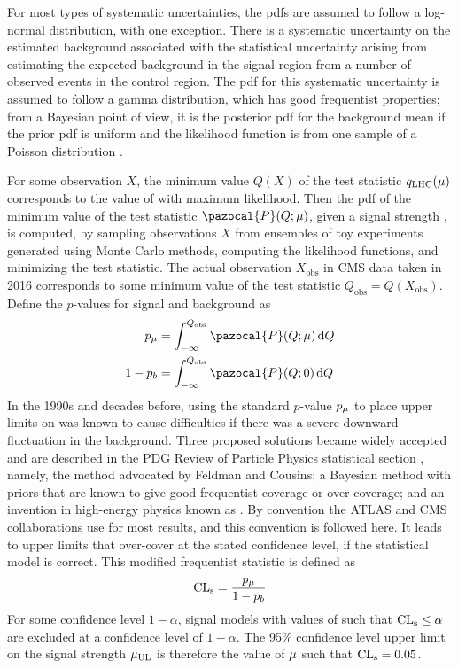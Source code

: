 For most types of systematic uncertainties, the pdfs are assumed to follow a log-normal distribution, with one exception.
There is a systematic uncertainty on the estimated background associated with the statistical uncertainty arising from estimating the expected background in the signal region from a number of observed events in the control region.
The pdf for this systematic uncertainty is assumed to follow a gamma distribution, which has good frequentist properties; from a Bayesian point of view, it is the posterior pdf for the background mean if the prior pdf is uniform and the likelihood function is from one sample of a Poisson distribution \cite{Cousins:ZBi2008, Cousins:LogNormal}.

For some observation $X$, the minimum value $Q(X)$ of the test statistic $q_\text{LHC}(\mu)$ corresponds to the value of \sigstr with maximum likelihood.
Then the pdf of the minimum value of the test statistic $\pazocal{P}(Q;\sigstr)$, given a signal strength \sigstr, is computed, by sampling observations $X$ from ensembles of toy experiments generated using Monte Carlo methods, computing the likelihood functions, and minimizing the test statistic.
The actual observation $X_\text{obs}$ in CMS data taken in 2016 corresponds to some minimum value of the test statistic $Q_\text{obs} = Q(X_\text{obs})$.
Define the $p$-values for signal and background as
\begin{align}
  p_\sigstr   &= \int_{-\infty}^{Q_\text{obs}}{\pazocal{P}(Q;\sigstr)\dd{Q}}\\
  1 - p_b     &= \int_{-\infty}^{Q_\text{obs}}{\pazocal{P}(Q;0)      \dd{Q}}
  \label{eq:dd:pvalues}
\end{align}
In the 1990s and decades before, using the standard $p$-value $p_\mu$ to place upper limits on \sigstr was known to cause difficulties if there was a severe downward fluctuation in the background.
Three proposed solutions became widely accepted and are described in the PDG Review of Particle Physics statistical section \cite{CowanPDGStats}, namely, the method advocated by Feldman and Cousins; a Bayesian method with priors that are known to give good frequentist coverage or over-coverage; and an invention in high-energy physics known as \CLs.
By convention the ATLAS and CMS collaborations use \CLs \cite{Read:CLs, Junk:CLs} for most results, and this convention is followed here.
It leads to upper limits that over-cover at the stated confidence level, if the statistical model is correct.
This modified frequentist statistic \CLs is defined as
\begin{equation}
  \text{CL}_\text{s} = \frac{p_\mu}{1-p_b}
  \label{eq:CLs}
\end{equation}
For some confidence level $1-\alpha$, signal models with values of \CLs such that $\text{CL}_\text{s} \leq \alpha$ are excluded at a confidence level of $1-\alpha$.
The 95\% confidence level upper limit on the signal strength $\mu_\text{UL}$ is therefore the value of $\mu$ such that $\text{CL}_\text{s} = 0.05$.

